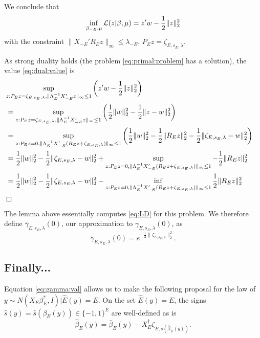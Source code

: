 \documentclass{article}
\newcommand{\OLS}{\bar{\beta}}
\newcommand{\REG}{\hat{\beta}}
\def\qed{\hfill $\Box$\newline}
\begin{document}
        We conclude that
        $$ \inf_{\beta_{-E},\mu}{\cal L}(z|\beta,\mu) = z'w -
        \frac{1}{2}\|z\|^2_2
        $$ with the constraint $\|X_{-E}'R_Ez\|_{\infty} \leq
        \lambda_{-E}$, $P_Ez=\zeta_{E,s_E,\lambda}$.

        As strong duality holds (the problem \eqref{eq:primal:problem}
        has a solution), the value \eqref{eq:dual:value} is
        $$
        \begin{aligned}
          \lefteqn{\sup_{z: P_Ez=\zeta_{E,s_E,\lambda},
              \|\Lambda_E^{-1}X_{-E}'z\|_{\infty} \leq 1} \left(z'w -
            \frac{1}{2}\|z\|^2_2 \right)} \\ &= \sup_{z:
            P_Ez=\zeta_{E,s_E,\lambda}, \|\Lambda_E^{-1}X_{-E}'z\|_{\infty}
            \leq 1} \left( \frac{1}{2}\|w\|^2_2 -
          \frac{1}{2}\|z-w\|^2_2 \right) \\ &= \sup_{z: P_Ez=0,
            \|\Lambda_E^{-1}X_{-E}'(R_Ez+\zeta_{E,s_E,\lambda})\|_{\infty}
            \leq 1} \left( \frac{1}{2}\|w\|^2_2 -
          \frac{1}{2}\|R_Ez\|^2_2 - \frac{1}{2}\|\zeta_{E,s_E,\lambda}-w\|^2_2
          \right) \\ &= \frac{1}{2} \|w\|^2_2 -
          \frac{1}{2}\|\zeta_{E,s_E,\lambda}-w\|^2_2 + \sup_{z: P_Ez=0,
            \|\Lambda_E^{-1}X_{-E}'(R_Ez+\zeta_{E,s_E,\lambda})\|_{\infty}
            \leq 1} -\frac{1}{2}\|R_Ez\|^2_2 \\ &= \frac{1}{2}
          \|w\|^2_2 - \frac{1}{2}\|\zeta_{E,s_E,\lambda}-w\|^2_2 - \inf_{z:
            P_Ez=0,
            \|\Lambda_E^{-1}X_{-E}'(R_Ez+\zeta_{E,s_E,\lambda})\|_{\infty}
            \leq 1} \frac{1}{2}\|R_Ez\|^2_2 \\
        \end{aligned}
        $$ \qed

        The lemma above essentially computes \eqref{eq:LD} for this
        problem.  We therefore define $\bar{\gamma}_{E,s_E,\lambda}(0)$, our
        approximation to $\gamma_{E,s_E,\lambda}(0)$, as
        \begin{equation}
          \label{eq:gamma:val}
          \bar{\gamma}_{E,s_E,\lambda}(0) =
          e^{-\frac{1}{2}\|\zeta_{E,s_E,\lambda}\|^2_2}.
          \end{equation}

        \subsection{Finally...}

        Equation \eqref{eq:gamma:val} allows us to make the following proposal for the
        law of $y \sim N(X_E\beta_E^*, I) | \hat{E}(y)=E$. On the set
        $\hat{E}(y)=E$, the signs $\hat{s}(y) = \hat{s}(\beta_E(y)) \in \{-1,1\}^E$ are well-defined as is
        $$
        \REG_E(y) = \OLS_E(y) - X_E^{\dagger}\zeta_{E,\hat{s}(\OLS_E(y))}.
        $$
\end{document}
